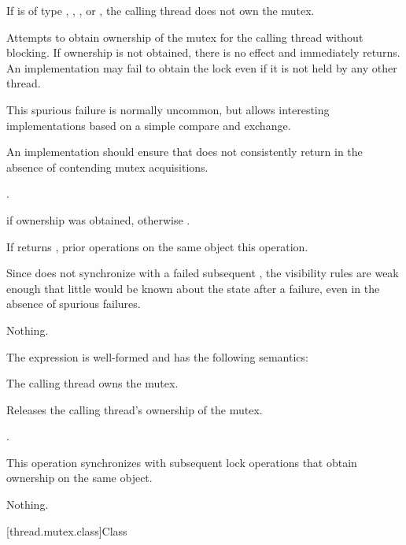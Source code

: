 \begin{itemdescr}
\pnum
\expects
If  is of type , ,
, or , the calling
thread does not own the mutex.

\pnum
\effects
Attempts to obtain ownership of the mutex for the calling thread without
blocking. If ownership is not obtained, there is no effect and 
immediately returns. An implementation may fail to obtain the lock even if it is not
held by any other thread.
\begin{note}
This spurious failure is normally uncommon, but
allows interesting implementations based on a simple
compare and exchange.
\end{note}
An implementation should ensure that  does not consistently return 
in the absence of contending mutex acquisitions.

\pnum
\returntype {}.

\pnum
\returns
{} if ownership was obtained, otherwise .

\pnum
\sync
If  returns , prior  operations
on the same object  this operation.
\begin{note}
Since  does not synchronize with a failed subsequent
, the visibility rules are weak enough that little would be
known about the state after a failure, even in the absence of spurious failures.
\end{note}

\pnum
\throws
Nothing.
\end{itemdescr}

\pnum
The expression  is well-formed and has the following semantics:

\begin{itemdescr}
\pnum
\expects
The calling thread owns the mutex.

\pnum
\effects
Releases the calling thread's ownership of the mutex.

\pnum
\returntype {}.

\pnum
\sync
This operation synchronizes with subsequent
lock operations that obtain ownership on the same object.

\pnum
\throws
Nothing.
\end{itemdescr}

[thread.mutex.class]{Class }

